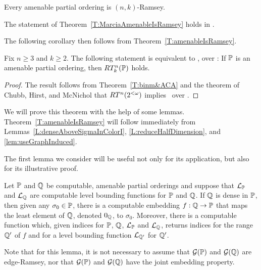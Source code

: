 \begin{thm}\label{T:MarciaAmenableIsRamsey}
Every amenable partial ordering is $(n,k)$-Ramsey.
\end{thm}

\begin{thm}\label{T:amenableIsRamsey}
The statement of Theorem~\ref{T:MarciaAmenableIsRamsey} holds in \ACAo.
\end{thm}

The following corollary then follows from Theorem~\ref{T:amenableIsRamsey}.

\begin{cor}\label{C:amenable&ACA}
Fix $n\geq 3$ and $k\geq 2$.
The following statement is equivalent to \ACAo, over \RCAo:
If $\mathbb{P}$ is an amenable partial ordering, then $RT^n_k(\mathbb{P})$ holds.
\end{cor}
\begin{proof}
The result follows from Theorem~\ref{T:binm&ACA} and the theorem
of Chubb, Hirst, and McNichol \cite{CHM} that $RT^n(2^{<\omega})$ implies \ACAo\ over \RCAo.
\end{proof}

We will prove this theorem with the help of some lemmas.
Theorem~\ref{T:amenableIsRamsey} will follow immediately from
Lemmas~\ref{L:denseAboveSigmaInColorI}, \ref{L:reduceHalfDimension}, and \ref{lem:useGraphInduced}.

The first lemma we consider will be useful not only for its application,
but also for its illustrative proof.

\begin{lem}\label{L:denseIsActuallyDense}
Let $\mathbb{P}$ and $\mathbb{Q}$ be computable, amenable partial orderings and
suppose that $\mathcal{L}_{\mathbb{P}}$ and $\mathcal{L}_{\mathbb{Q}}$ are computable level bounding functions for $\mathbb{P}$ and $\mathbb{Q}$.
If $\mathbb{Q}$ is dense in $\mathbb{P}$, then
given any $\sigma_0\in\mathbb{P}$, there is a computable embedding $f:\mathbb{Q}\to\mathbb{P}$ that maps
the least element of $\mathbb{Q}$, denoted $0_{\mathbb{Q}}$, to $\sigma_0$.
Moreover, there is a computable function which,
given indices for $\mathbb{P}$, $\mathbb{Q}$, $\mathcal{L}_{\mathbb{P}}$ and $\mathcal{L}_{\mathbb{Q}}$,
returns indices for the range $\mathbb{Q}'$ of $f$
and for a level bounding function $\mathcal{L}_{\mathbb{Q}'}$ for $\mathbb{Q}'$.
\end{lem}

Note that for this lemma, it is not necessary to assume that $\mathcal{G}(\mathbb{P})$ and $\mathcal{G}(\mathbb{Q})$ are edge-Ramsey,
nor that $\mathcal{G}(\mathbb{P})$ and $\mathcal{G}(\mathbb{Q})$ have the joint embedding property.

